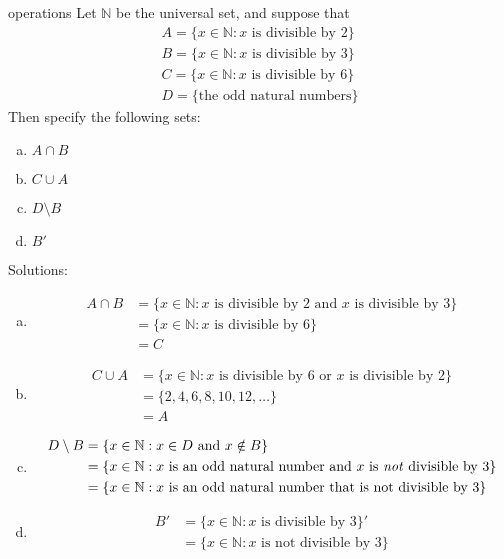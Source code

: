 \begin{example}{operations}
Let ${\mathbb N}$ be the universal set, and suppose that
\begin{align*}
A = \{ x \in {\mathbb N} : x \text{ is divisible by 2}\} \\ 
B = \{ x \in {\mathbb N} : x \text{ is divisible by 3}\} \\ 
C = \{ x \in {\mathbb N} : x \text{ is divisible by 6}\} \\
D = \{\text{the odd natural numbers}\}
\end{align*} 
Then specify the following sets:
\begin{enumerate}[(a)]
\item 
$A \cap B$
\item
$C \cup A$
\item
 $D \setminus B$
\item
$B'$
\end{enumerate}

\noindent
Solutions:
\begin{enumerate}[(a)]
\item
\begin{align*}
A \cap B &= \{ x \in {\mathbb N} : x \text{ is divisible by 2} \text{ and } x \text{ is divisible by 3}\} \\
& = \{ x \in {\mathbb N} : x \text{ is divisible by 6}\} \\
& = C
\end{align*}
\item
\begin{align*}
C \cup A &= \{ x \in {\mathbb N} : x \text{ is divisible by 6} \text{ or } x \text{ is divisible by 2}\} \\
&= \{2, 4, 6, 8, 10, 12, \ldots \} \\
&= A
\end{align*}
\item
\begin{align*}
D \setminus B &= \{ x \in {\mathbb N} : x \in D \text{ and } x \notin B \} \\
&= \{ x \in {\mathbb N} : x \text{ is an odd natural number} \text{ and } x \text{ is \emph{not} divisible by 3} \} \\
&= \{  x \in {\mathbb N} : x \text{ is an odd natural number that is not divisible by 3} \} 
\end{align*} 
\item
\begin{align*}
B' &= \{ x \in {\mathbb N} : x \text{ is divisible by 3}\}' \\
&= \{ x \in {\mathbb N} : x \text{ is not divisible by 3}\}
\end{align*}
\end{enumerate} 
\end{example}


